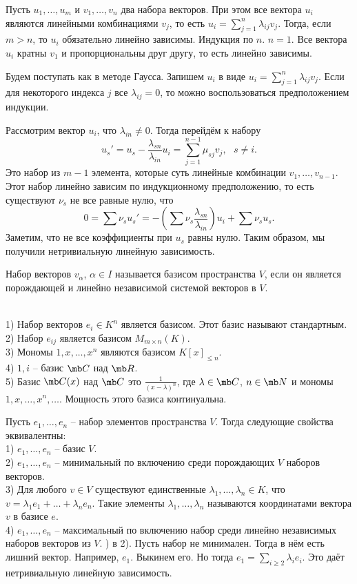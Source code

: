  Пусть $u_1,\dots,u_m$ и $v_1,\dots,v_n$ два набора векторов. При этом все вектора $u_i$ являются линейными комбинациями $v_j$, то есть $u_i=\sum_{j=1}^n \lambda_{ij}v_j$. Тогда, если $m>n$, то $u_i$ обязательно линейно зависимы.
\ethrm
\proof Индукция по $n$. $n=1$. Все вектора $u_i$ кратны $v_1$ и пропорциональны друг другу, то есть линейно зависимы.

Будем поступать как в методе Гаусса. Запишем $u_i$ в виде
$u_i=\sum_{j=1}^n \lambda_{ij}v_j$. Если для некоторого индекса $j$ все $\lambda_{ij}=0$, то можно воспользоваться предположением индукции.

Рассмотрим вектор $u_i$, что $\lambda_{in}\neq 0$. Тогда перейдём к набору $$u_s'=u_s - \frac{\lambda_{sn}}{\lambda_{in}}u_i= \sum_{j=1}^{n-1} \mu_{sj} v_j, \,\,\,\, s\neq i.$$
Это набор из $m-1$ элемента, которые суть линейные комбинации $v_1,\dots,v_{n-1}$. Этот набор линейно зависим по индукционному предположению, то есть существуют $\nu_{s}$ не все равные нулю, что
$$0=\sum \nu_s u_{s}'= -\left(\sum\nu_s\frac{\lambda_{sn}}{\lambda_{in}}\right)u_i +\sum \nu_s u_s.$$
Заметим, что не все коэффициенты при $u_s$ равны нулю. Таким образом, мы получили нетривиальную линейную зависимость.
\endproof






\dfn[Базис] Набор векторов $v_{\alpha}$, $\alpha \in I$ называется базисом пространства $V$, если он является порождающей и линейно независимой системой векторов в $V$. \edfn

\exm\\
1) Набор векторов $e_i \in K^n$ является базисом. Этот базис называют стандартным.\\
2) Набор $e_{ij}$ является базисом $M_{m\times n}(K)$.\\
3) Мономы $1,x, \dots, x^n$ являются базисом $K[x]_{\leq n}$.\\
4) $1,i$ -- базис $\mb C$ над $\mb R$.\\
5) Базис $\mb C(x)$ над $\mb C$ это $\frac{1}{(x-\lambda)^n}$, где $\lambda \in \mb C$, $n\in\mb N$ и мономы $1,x,\dots, x^n, \dots$. Мощность этого базиса континуальна.








\lm[Переформулировки] Пусть $e_1,\dots,e_n$ -- набор элементов пространства $V$.
Тогда следующие свойства эквивалентны: \\
1) $e_1,\dots,e_n$ -- базис $V$.\\
2) $e_1,\dots,e_n$ -- минимальный по включению среди порождающих $V$ наборов векторов.\\
3) Для любого $v\in V$ существуют единственные $\lambda_1,\dots,\lambda_n \in K$, что $v=\lambda_1e_1+\dots+\lambda_ne_n$. Такие элементы $\lambda_1,\dots,\lambda_n$ называются координатами вектора $v$ в базисе $e$.\\
4) $e_1,\dots,e_n$ -- максимальный по включению набор среди линейно независимых наборов векторов из $V$.
)  в 2). Пусть набор не минимален. Тогда в нём есть лишний вектор. Например, $e_1$. Выкинем его. Но тогда $e_1=\sum_{i\geq 2}\lambda_i e_i$. Это даёт нетривиальную линейную зависимость.


